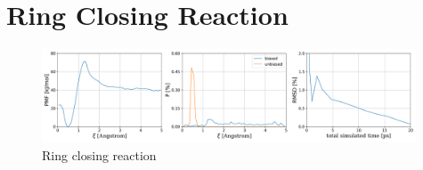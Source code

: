 \section{Ring Closing Reaction}
\label{sec:RCR}

\begin{figure}[H]
  \centering
    \includegraphics[width=0.99\textwidth]{bilder/results/R2_ool_results}
   \caption{Ring closing reaction}
   \label{fig:ool}
\end{figure}
